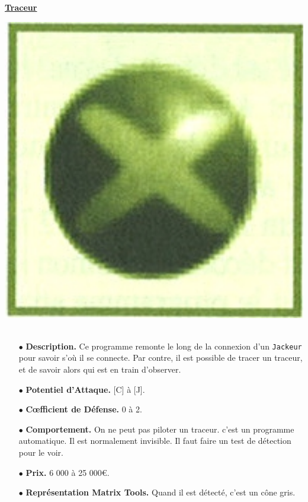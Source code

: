 \documentclass[11pt,twoside,a4paper]{article}
\begin{document}
\begin{multicols*}{2}
\underline{\textbf{Traceur}}~\\
\begin{minipage}[h]{0.12\textwidth}
	\includegraphics[width=1.00\textwidth]{img/catalogueProgrammesBrouilleur.jpg}~\\
\end{minipage} \hfill \begin{minipage}[h]{0.37\textwidth}
	\begin{itemize}
		\small
		\item[$\bullet$] \textbf{Description. } Ce programme remonte le long de la connexion d'un \texttt{Jackeur} pour savoir s'o{\`u} il se connecte. Par contre, il est possible de tracer un traceur, et de savoir alors qui est en train d'observer. 
	\end{itemize}
\end{minipage}
\begin{itemize}
	\item[$\bullet$] \textbf{Potentiel d'Attaque. }[C] {\`a} [J]. 
	\item[$\bullet$] \textbf{C\oe fficient de D{\'e}fense. }0 {\`a} 2. 
	\item[$\bullet$] \textbf{Comportement. }On ne peut pas piloter un traceur. c'est un programme automatique. Il est normalement invisible. Il faut faire un test de d{\'e}tection pour le voir. 
	\item[$\bullet$] \textbf{Prix. }6 000 {\`a} 25 000\euro . 
	\item[$\bullet$] \textbf{Repr{\'e}sentation Matrix Tools. }Quand il est d{\'e}tect{\'e}, c'est un c{\^o}ne gris. 
\end{itemize} %


\end{multicols*}
\end{document}
